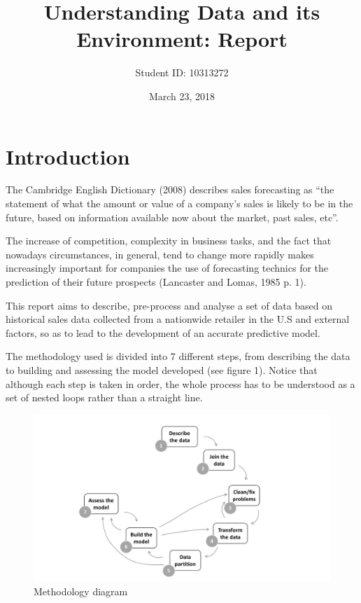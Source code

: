 \documentclass[11pt,]{article}
\title{Understanding Data and its Environment: Report}
\author{Student ID: 10313272}
\date{March 23, 2018}
\begin{document}
\maketitle

{
\setcounter{tocdepth}{2}
\tableofcontents
}
\pagebreak

\section{Introduction}\label{introduction}

The Cambridge English Dictionary (2008) describes sales forecasting as
``the statement of what the amount or value of a company's sales is
likely to be in the future, based on information available now about the
market, past sales, etc''.

The increase of competition, complexity in business tasks, and the fact
that nowadays circumstances, in general, tend to change more rapidly
makes increasingly important for companies the use of forecasting
technics for the prediction of their future prospects (Lancaster and
Lomas, 1985 p. 1).

This report aims to describe, pre-process and analyse a set of data
based on historical sales data collected from a nationwide retailer in
the U.S and external factors, so as to lead to the development of an
accurate predictive model.

The methodology used is divided into 7 different steps, from describing
the data to building and assessing the model developed (see figure 1).
Notice that although each step is taken in order, the whole process has
to be understood as a set of nested loops rather than a straight line.

\begin{figure}[htbp]
\centering
\includegraphics{images/Methodology diagram.jpg}
\caption{Methodology diagram \label{}}
\end{figure}
\end{document}
